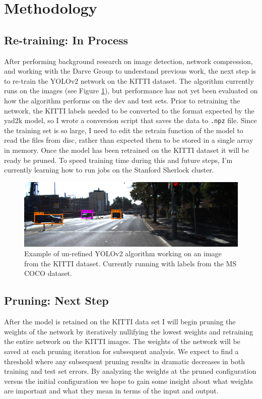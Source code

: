 \documentclass[10pt,letterpaper]{article}
\begin{document}
	
	\section{Methodology}
	\subsection{Re-training: In Process}
	After performing background research on image detection, network compression, and working with the Darve Group to understand previous work, the next step is to re-train the YOLOv2 network on the KITTI dataset. The algorithm currently runs on the images (see Figure \ref{fig:kitti_test}), but performance has not yet been evaluated on how the algorithm performs on the dev and test sets. Prior to retraining the network, the KITTI labels needed to be converted to the format expected by the yad2k model, so I wrote a conversion script that saves the data to \texttt{.npz} file. Since the training set is so large, I need to edit the retrain function of the model to read the files from disc, rather than expected them to be stored in a single array in memory. Once the model has been retrained on the KITTI dataset it will be ready be pruned. To speed training time during this and future steps, I'm currently learning how to run jobs on the Stanford Sherlock cluster.
	
	\begin{figure}
		\centering
		\includegraphics[width=\linewidth]{images/kitti_test}
		\caption{Example of un-refined YOLOv2 algorithm working on an image from the KITTI dataset. Currently running with labels from the MS COCO dataset.}
		\label{fig:kitti_test}
	\end{figure}
	
	\subsection{Pruning: Next Step}
	After the model is retained on the KITTI data set I will begin pruning the weights of the network by iteratively nullifying the lowest weights and retraining the entire network on the KITTI images. The weights of the network will be saved at each pruning iteration for subsequent analysis. We expect to find a threshold where any subsequent pruning results in dramatic decreases in both training and test set errors. By analyzing the weights at the pruned configuration versus the initial configuration we hope to gain some insight about what weights are important and what they mean in terms of the input and output. 
	
\end{document}
